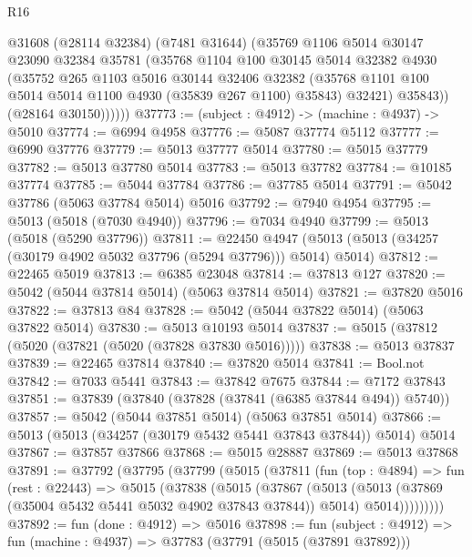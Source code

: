 \begin{lexlean}{R16}
\begin{coremodule}
              @31608
              (@28114 @32384)
              (@7481 @31644)
              (@35769
                @1106
                @5014
                @30147
                @23090
                @32384
                @35781
                (@35768
                  @1104
                  @100
                  @30145
                  @5014
                  @32382
                  @4930
                  (@35752
                    @265
                    @1103
                    @5016
                    @30144
                    @32406
                    @32382
                    (@35768 @1101 @100 @5014 @5014 @1100 @4930 (@35839 @267 @1100) @35843)
                    @32421)
                  @35843))
              (@28164 @30150))))))
@37773 := (subject : @4912) -> (machine : @4937) -> @5010
@37774 := @6994 @4958
@37776 := @5087 @37774 @5112
@37777 := @6990 @37776
@37779 := @5013 @37777 @5014
@37780 := @5015 @37779
@37782 := @5013 @37780 @5014
@37783 := @5013 @37782
@37784 := @10185 @37774
@37785 := @5044 @37784
@37786 := @37785 @5014
@37791 := @5042 @37786 (@5063 @37784 @5014) @5016
@37792 := @7940 @4954
@37795 := @5013 (@5018 (@7030 @4940))
@37796 := @7034 @4940
@37799 := @5013 (@5018 (@5290 @37796))
@37811 := @22450
    @4947
    (@5013 (@5013 (@34257 (@30179 @4902 @5032 @37796 (@5294 @37796))) @5014) @5014)
@37812 := @22465 @5019
@37813 := @6385 @23048
@37814 := @37813 @127
@37820 := @5042 (@5044 @37814 @5014) (@5063 @37814 @5014)
@37821 := @37820 @5016
@37822 := @37813 @84
@37828 := @5042 (@5044 @37822 @5014) (@5063 @37822 @5014)
@37830 := @5013 @10193 @5014
@37837 := @5015 (@37812 (@5020 (@37821 (@5020 (@37828 @37830 @5016)))))
@37838 := @5013 @37837
@37839 := @22465 @37814
@37840 := @37820 @5014
@37841 := Bool.not
@37842 := @7033 @5441
@37843 := @37842 @7675
@37844 := @7172 @37843
@37851 := @37839 (@37840 (@37828 (@37841 (@6385 @37844 @494)) @5740))
@37857 := @5042 (@5044 @37851 @5014) (@5063 @37851 @5014)
@37866 := @5013 (@5013 (@34257 (@30179 @5432 @5441 @37843 @37844)) @5014) @5014
@37867 := @37857 @37866
@37868 := @5015 @28887
@37869 := @5013 @37868
@37891 := @37792
    (@37795
      (@37799
        (@5015
          (@37811
            (fun (top : @4894) =>
            fun (rest : @22443) =>
            @5015
              (@37838
                (@5015
                  (@37867
                    (@5013
                      (@5013 (@37869 (@35004 @5432 @5441 @5032 @4902 @37843 @37844)) @5014)
                      @5014)))))))))
@37892 := fun (done : @4912) => @5016
@37898 := fun (subject : @4912) => fun (machine : @4937) => @37783 (@37791 (@5015 (@37891 @37892)))

\end{coremodule}
\end{lexlean}
